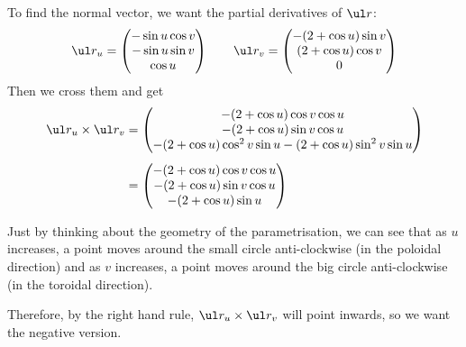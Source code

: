 \documentclass[a4paper]{article}
\begin{document}
To find the normal vector, we want the partial derivatives of $\ul r$: $$
\ul r_u = \begin{pmatrix} -\sin u \cos v \\ -\sin u \sin v \\ \cos u \end{pmatrix} \qquad
\ul r_v = \begin{pmatrix} -(2 + \cos u) \sin v \\ (2 + \cos u) \cos v \\ 0 \end{pmatrix}
$$
Then we cross them and get \begin{align*}
\ul r_u \times \ul r_v &= \begin{pmatrix} -(2 + \cos u) \cos v \cos u \\ -(2 + \cos u) \sin v \cos u \\ -(2 + \cos u) \cos^2 v \sin u - (2 + \cos u) \sin^2 v \sin u \end{pmatrix}\\[1ex]
&= \begin{pmatrix} -(2 + \cos u) \cos v \cos u \\ -(2 + \cos u) \sin v \cos u \\ -(2 + \cos u) \sin u \end{pmatrix}
\end{align*}

Just by thinking about the geometry of the parametrisation, we can see that as $u$ increases, a point moves around the small circle anti-clockwise (in the poloidal direction) and as $v$ increases, a point moves around the big circle anti-clockwise (in the toroidal direction).

Therefore, by the right hand rule, $\ul r_u \times \ul r_v$ will point inwards, so we want the negative version.
\end{document}
